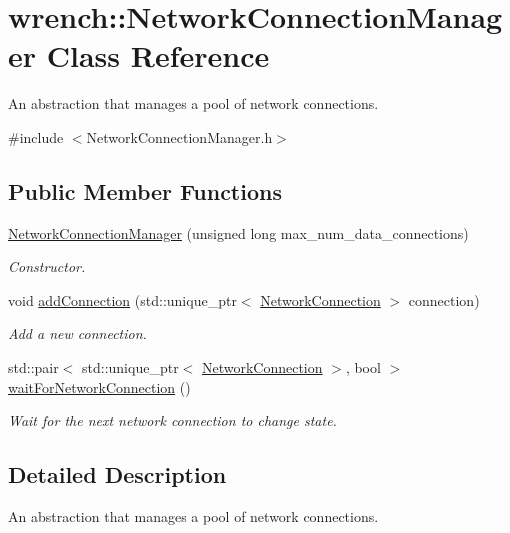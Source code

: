 \hypertarget{classwrench_1_1_network_connection_manager}{}\section{wrench\+:\+:Network\+Connection\+Manager Class Reference}
\label{classwrench_1_1_network_connection_manager}


An abstraction that manages a pool of network connections.  




{\ttfamily \#include $<$Network\+Connection\+Manager.\+h$>$}

\subsection*{Public Member Functions}
\begin{DoxyCompactItemize}
\item 
\hyperlink{classwrench_1_1_network_connection_manager_afd93226fb4d7ab8949fe8319039c0038}{Network\+Connection\+Manager} (unsigned long max\+\_\+num\+\_\+data\+\_\+connections)
\begin{DoxyCompactList}\small\item\em Constructor. \end{DoxyCompactList}\item 
void \hyperlink{classwrench_1_1_network_connection_manager_afc8f9783ff5876f8fc98c2ab23734c6d}{add\+Connection} (std\+::unique\+\_\+ptr$<$ \hyperlink{classwrench_1_1_network_connection}{Network\+Connection} $>$ connection)
\begin{DoxyCompactList}\small\item\em Add a new connection. \end{DoxyCompactList}\item 
std\+::pair$<$ std\+::unique\+\_\+ptr$<$ \hyperlink{classwrench_1_1_network_connection}{Network\+Connection} $>$, bool $>$ \hyperlink{classwrench_1_1_network_connection_manager_ae393426d265b864afe001ff4d887c5de}{wait\+For\+Network\+Connection} ()
\begin{DoxyCompactList}\small\item\em Wait for the next network connection to change state. \end{DoxyCompactList}\end{DoxyCompactItemize}


\subsection{Detailed Description}
An abstraction that manages a pool of network connections. 

